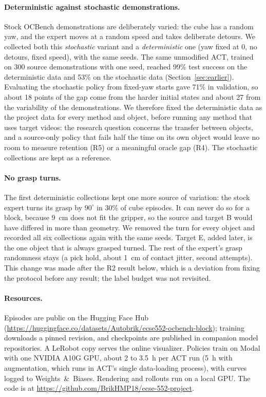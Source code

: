 \documentclass{article}
\begin{document}
\paragraph{Deterministic against stochastic demonstrations.}
Stock OCBench demonstrations are deliberately varied: the cube has a random yaw, and the
expert moves at a random speed and takes deliberate detours. We collected both this
\emph{stochastic} variant and a \emph{deterministic} one (yaw fixed at 0, no detours,
fixed speed), with the same seeds. The same unmodified ACT, trained on 300 source
demonstrations with one seed, reached 99\% test success on the deterministic data and
53\% on the stochastic data (Section~\ref{sec:earlier}). Evaluating the stochastic policy
from fixed-yaw starts gave 71\% in validation, so about 18 points of the gap come from
the harder initial states and about 27 from the variability of the demonstrations. We
therefore fixed the deterministic data as the project data for every method and object,
before running any method that uses target videos: the research question concerns the
transfer between objects, and a source-only policy that fails half the time on its own
object would leave no room to measure retention (R5) or a meaningful oracle gap (R4).
The stochastic collections are kept as a reference.

\paragraph{No grasp turns.}
The first deterministic collections kept one more source of variation: the stock expert
turns its grasp by $90^\circ$ in 30\% of cube episodes. It can never do so for a block,
because 9~cm does not fit the gripper, so the source and target B would have differed in
more than geometry. We removed the turn for every object and recorded all six collections
again with the same seeds. Target E, added later, is the one object that is always
grasped turned. The rest of the expert's grasp randomness stays (a pick hold,
about 1~cm of contact jitter, second attempts). This change was made after the R2 result
below, which is a deviation from fixing the protocol before any result; the label budget
was not revisited.

\paragraph{Resources.}
Episodes are public on the Hugging Face Hub
(\url{https://huggingface.co/datasets/Autobrik/ecse552-ocbench-block}); training
downloads a pinned revision, and checkpoints are published in companion model
repositories. A LeRobot copy \citep{cadene2024lerobot} serves the online visualizer.
Policies train on Modal with one NVIDIA A10G GPU, about 2 to 3.5~h per ACT run (5~h with
augmentation, which runs in ACT's single data-loading process), with curves
logged to Weights~\&~Biases. Rendering and rollouts run on a local GPU. The code is at
\url{https://github.com/BrikHMP18/ecse-552-project}.
\end{document}
